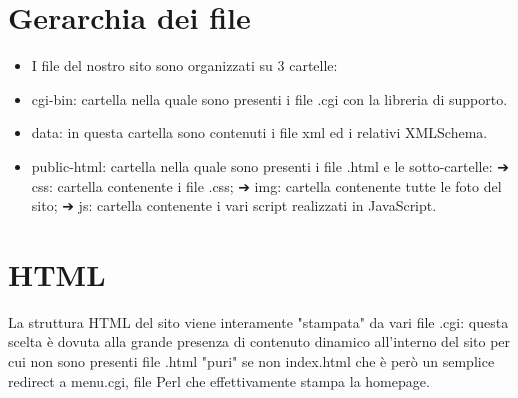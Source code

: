\documentclass[12pt]{article}
\begin{document}
			\section{Gerarchia dei file}
			\begin{itemize}
				\item I file del nostro sito sono organizzati su 3 cartelle:
				\item cgi-bin: cartella nella quale sono presenti i file .cgi con la libreria di supporto.
				\item data: in questa cartella sono contenuti i file xml ed i relativi XMLSchema.
				\item public-html: cartella nella quale sono presenti i file .html e le sotto-cartelle:
				➔ css: cartella contenente i file .css;
				➔ img: cartella contenente tutte le foto del sito;
				➔ js: cartella contenente i vari script realizzati in JavaScript.
			\end{itemize}
			\section{HTML}
			La struttura HTML del sito viene interamente "stampata" da vari file .cgi: questa scelta è dovuta alla grande presenza di contenuto dinamico all'interno del sito per cui non sono presenti file .html "puri" se non index.html che è però un semplice redirect a menu.cgi, file Perl che effettivamente stampa la homepage.
\end{document}
